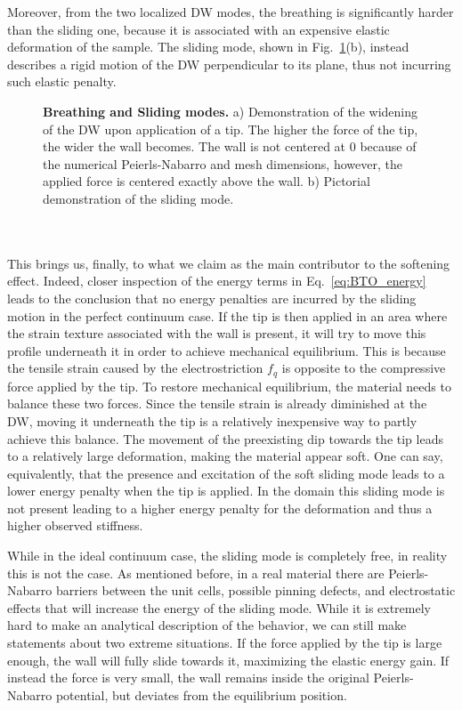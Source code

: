 Moreover, from the two localized DW modes, the breathing is significantly harder than the sliding one, because it is associated with an expensive elastic deformation of the sample.
The sliding mode, shown in Fig.~\ref{fig:BTO_breathing_sliding}(b), instead describes a rigid motion of the DW perpendicular to its plane, thus not incurring such elastic penalty. 
\begin{figure}
	\caption{\label{fig:BTO_breathing_sliding}{\bf Breathing and Sliding modes.} a) Demonstration of the widening of the DW upon application of a tip. The higher the force of the tip, the wider the wall becomes. The wall is not centered at 0 because of the numerical Peierls-Nabarro and mesh dimensions, however, the applied force is centered exactly above the wall. b) Pictorial demonstration of the sliding mode.}
\end{figure}
\\\\
This brings us, finally, to what we claim as the main contributor to the softening effect.
Indeed, closer inspection of the energy terms in Eq.~\eqref{eq:BTO_energy} leads to the conclusion that no energy penalties are incurred by the sliding motion in the perfect continuum case.
If the tip is then applied in an area where the strain texture associated with the wall is present, it will try to move this profile underneath it in order to achieve mechanical equilibrium.
This is because the tensile strain caused by the electrostriction $f_q$ is opposite to the compressive force applied by the tip.
To restore mechanical equilibrium, the material needs to balance these two forces.
Since the tensile strain is already diminished at the DW, moving it underneath the tip is a relatively inexpensive way to partly achieve this balance.
The movement of the preexisting dip towards the tip leads to a relatively large deformation, making the material appear soft.
One can say, equivalently, that the presence and excitation of the soft sliding mode leads to a lower energy penalty when the tip is applied.
In the domain this sliding mode is not present leading to a higher energy penalty for the deformation and thus a higher observed stiffness.

While in the ideal continuum case, the sliding mode is completely free, in reality this is not the case.
As mentioned before, in a real material there are Peierls-Nabarro barriers between the unit cells, possible pinning defects, and electrostatic effects that will increase the energy of the sliding mode.
While it is extremely hard to make an analytical description of the behavior, we can still make statements about two extreme situations.
If the force applied by the tip is large enough, the wall will fully slide towards it, maximizing the elastic energy gain.
If instead the force is very small, the wall remains inside the original Peierls-Nabarro potential, but deviates from the equilibrium position.

